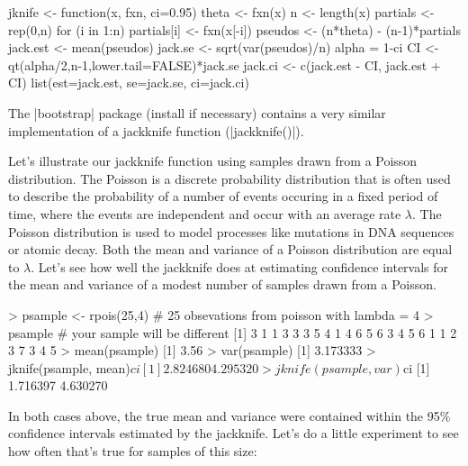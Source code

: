 \begin{R}
jknife <- function(x, fxn, ci=0.95) {
    theta <- fxn(x)
    n <- length(x)
    partials <- rep(0,n)
    for (i in 1:n){
       partials[i] <- fxn(x[-i])
    }
    pseudos <- (n*theta) - (n-1)*partials
    jack.est <- mean(pseudos)
    jack.se <- sqrt(var(pseudos)/n)
    alpha = 1-ci
    CI <- qt(alpha/2,n-1,lower.tail=FALSE)*jack.se
    jack.ci <- c(jack.est - CI, jack.est + CI)
    list(est=jack.est, se=jack.se, ci=jack.ci)   
}
\end{R}

The |bootstrap| package (install if necessary) contains a very similar implementation of a jackknife function (|jackknife()|).

Let's illustrate our jackknife function using samples drawn from a Poisson distribution. The Poisson is a discrete probability distribution that is often used to describe the probability of a number of events occuring in a fixed period of time, where the events are independent and occur with an average rate $\lambda$. The Poisson distribution is used to model processes like mutations in DNA sequences or atomic decay.  Both the mean and variance of a Poisson distribution are equal to $\lambda$. Let's see how well the jackknife does at estimating confidence intervals for  the mean and variance of a modest number of samples drawn from a Poisson.

\begin{R}
> psample <- rpois(25,4) # 25 obsevations from poisson with lambda = 4
> psample  # your sample will be different
 [1] 3 1 1 3 3 3 5 4 1 4 6 5 6 3 4 5 6 1 1 2 3 7 3 4 5
> mean(psample)
[1] 3.56
> var(psample)
[1] 3.173333
> jknife(psample, mean)$ci
[1] 2.824680 4.295320
> jknife(psample, var)$ci
[1] 1.716397 4.630270    
\end{R}

In both cases above, the true mean and variance were contained within the 95\% confidence intervals estimated by the jackknife. Let's do a little experiment to see how often that's true for samples of this size:

